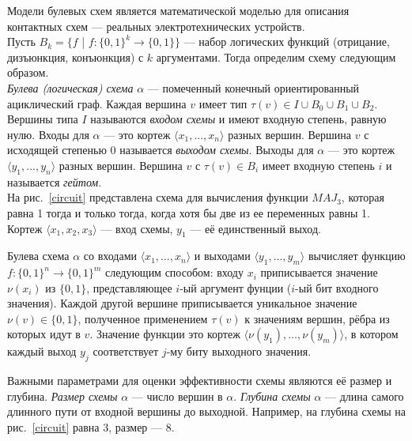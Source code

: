Модели булевых схем является математической моделью для описания контактных схем --- реальных электротехнических устройств. \\
Пусть $B_k = \{f$ | $f: {\{0,1\}}^k \to \{0, 1\}\}$ --- набор логических функций (отрицание, дизъюнкция, конъюнкция) с $k$ аргументами.
Тогда определим схему следующим образом.
\\
\textit{Булева (логическая) схема} $\alpha$ --- помеченный конечный ориентированный ациклический граф. Каждая вершина $v$ имеет тип $\tau(v)  \in I \cup B_0 \cup B_1 \cup B_2$. Вершины типа $I$ называются \textit{входом схемы} и имеют входную степень, равную нулю. Входы для $\alpha$ --- это кортеж $\langle x_1, ..., x_n \rangle$ разных вершин. Вершина $v$ с исходящей степенью 0 называется \textit{выходом схемы}. Выходы для $\alpha$ --- это кортеж $\langle y_1, ..., y_n \rangle$ разных вершин. Вершина $v$ с $\tau(v) \in B_i$ имеет входную степень $i$ и называется \textit{гейтом}.
\\
На рис.~\ref{circuit} представлена схема для вычисления функции ${MAJ}_3$, которая равна 1 тогда и только тогда, когда хотя бы две из ее переменных равны 1. Кортеж $\langle x_1, x_2, x_3 \rangle$ --- вход схемы, $ y_1$ --- её единственный  выход.

Булева схема $\alpha$ со входами  $\langle x_1, ..., x_n \rangle$ и выходами $\langle y_1, ..., y_m \rangle$ вычисляет функцию $f: {\{0,1\}}^n \to {\{0, 1\}}^m$ следующим способом: входу $x_i$ приписывается значение $\nu(x_i)$ из $\{0, 1\}$, представляющее $i$-ый аргумент фунции ($i$-ый бит входного значения). Каждой другой вершине приписывается уникальное значение $\nu(v) \in \{0, 1\}$,  полученное применением $\tau(v)$ к значениям вершин, рёбра из которых идут в $v$. Значение функции это кортеж $\langle \nu(y_1), ..., \nu(y_m) \rangle$, в котором каждый выход $y_j$ соответствует $j$-му биту выходного значения.

Важными параметрами для оценки эффективности схемы являются её размер и глубина.
\textit{Размер схемы}  $\alpha$ --- число вершин в $\alpha$. \textit{Глубина схемы} $\alpha$ --- длина самого длинного пути от входной вершины до выходной.
Например, на глубина схемы на рис.~\ref{circuit} равна 3, размер --- 8.

